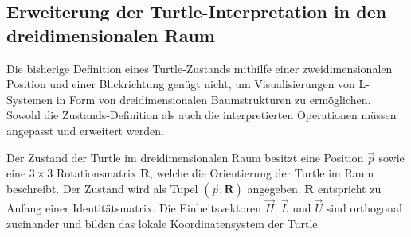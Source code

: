\subsection{Erweiterung der Turtle-Interpretation in den dreidimensionalen Raum}

Die bisherige Definition eines Turtle-Zustands mithilfe einer zweidimensionalen Position und einer Blickrichtung genügt nicht, um Visualisierungen von L-Systemen in Form von dreidimensionalen Baumstrukturen zu ermöglichen. Sowohl die Zustands-Definition als auch die interpretierten Operationen müssen angepasst und erweitert werden.

Der Zustand der Turtle im dreidimensionalen Raum besitzt eine Position $\overrightarrow{p}$ sowie eine $3\times3$ Rotationsmatrix $\boldsymbol{R}$, welche die Orientierung der Turtle im Raum beschreibt. Der Zustand wird als Tupel $(\overrightarrow{p}, \boldsymbol{R})$ angegeben. $\boldsymbol{R}$ entspricht zu Anfang einer Identitätsmatrix. Die Einheitsvektoren $\overrightarrow{H}$, $\overrightarrow{L}$ und $\overrightarrow{U}$  sind orthogonal zueinander und bilden das lokale Koordinatensystem der Turtle. 

